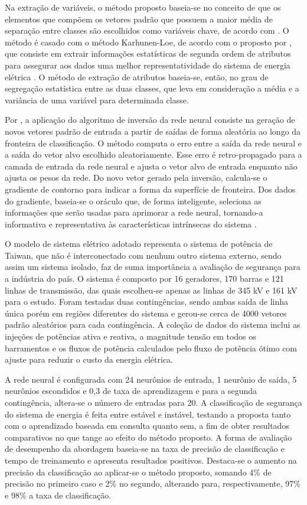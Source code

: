 \documentclass[12pt,oneside,a4paper,chapter=TITLE,section=TITLE,sumario=tradicional,english,brazil]{abntex2}
\begin{document}
Na extração de variáveis, o método proposto baseia-se no conceito de que os elementos que compõem os vetores padrão que possuem a maior média de separação entre classes são escolhidos como variáveis chave, de acordo com \textcite{pang1974}. O método é casado com o método Karhunen-Loe, de acordo com o proposto por \textcite{fukunaga1970}, que consiste em extrair informações estatísticas de segunda ordem de atributos para assegurar aos dados uma melhor representatividade do sistema de energia elétrica \cite{duda1973}. O método de extração de atributos baseia-se, então, no grau de segregação estatística entre as duas classes, que leva em consideração a média e a variância de uma variável para determinada classe.\par
Por \cite{linden1989}, a aplicação do algoritmo de inversão da rede neural consiste na geração de novos vetores padrão de entrada a partir de saídas de forma aleatória ao longo da fronteira de classificação. O método computa o erro entre a saída da rede neural e a saída do vetor alvo escolhido aleatoriamente. Esse erro é retro-propagado para a camada de entrada da rede neural e ajusta o vetor alvo de entrada enquanto não ajusta os pesos da rede. Do novo vetor gerado pela inversão, calcula-se o gradiente de contorno para indicar a forma da superfície de fronteira. Dos dados do gradiente, baseia-se o oráculo que, de forma inteligente, seleciona as informações que serão usadas para aprimorar a rede neural, tornando-a informativa e representativa às características intrínsecas do sistema \cite{linden1989}.\par
O modelo de sistema elétrico adotado representa o sistema de potência de Taiwan, que não é interconectado com nenhum outro sistema externo, sendo assim um sistema isolado, faz de suma importância a avaliação de segurança para a indústria do país. O sistema é composto por 16 geradores, 170 barras e 121 linhas de transmissão, das quais escolheu-se apenas as linhas de 345 kV e 161 kV para o estudo. Foram testadas duas contingências, sendo ambas saída de linha única porém em regiões diferentes do sistema e gerou-se cerca de 4000 vetores padrão aleatórios para cada contingência. A coleção de dados do sistema inclui as injeções de potências ativa e reativa, a magnitude tensão em todos os barramentos e os fluxos de potência calculados pelo fluxo de potência ótimo com ajuste para reduzir o custo da energia elétrica. \par 
A rede neural é configurada com 24 neurônios de entrada, 1 neurônio de saída, 5 neurônios escondidos e 0,3 de taxa de aprendizagem e para a segunda contingência, altera-se o número de entradas para 20. A classificação de segurança do sistema de energia é feita entre estável e instável, testando a proposta tanto com o aprendizado baseada em consulta quanto sem, a fim de obter resultados comparativos no que tange ao efeito do método proposto. A forma de avaliação de desempenho da abordagem baseia-se na taxa de precisão de classificação e tempo de treinamento e apresenta resultados positivos. Destaca-se o aumento na precisão da classificação ao aplicar-se o método proposto, somando 4\% de precisão no primeiro caso e 2\% no segundo, alterando para, respectivamente, 97\% e 98\% a taxa de classificação.\par
\end{document}
